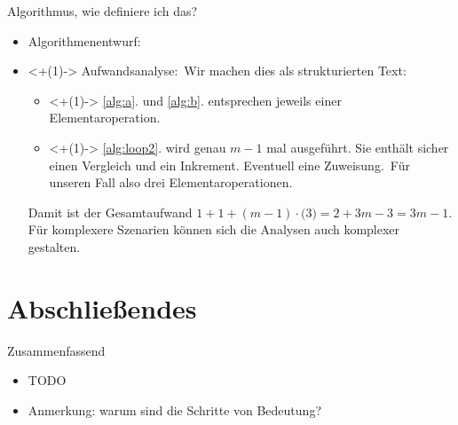\begin{frame}{Algorithmus, wie definiere ich das?}
\begin{itemize}[]
    \item Algorithmenentwurf: \\
    \usebox\algobox
    \item<+(1)-> Aufwandsanalyse:\pause\ Wir machen dies als strukturierten Text: \begin{itemize}
        \item<+(1)-> \ref{alg:a}. und \ref{alg:b}. entsprechen jeweils einer Elementaroperation.
        \item<+(1)-> \ref{alg:loop2}. wird genau \(m - 1\) mal ausgeführt. Sie enthält sicher einen Vergleich und ein Inkrement. Eventuell eine Zuweisung.\pause\ Für unseren Fall also drei Elementaroperationen.
    \end{itemize}
        \pause Damit ist der Gesamtaufwand \(1 + 1 + (m - 1) \cdot \bigl( 3 \bigr) = 2 + 3m - 3 = 3m - 1\).\medskip\\
        \pause Für komplexere Szenarien können sich die Analysen auch komplexer gestalten.
\end{itemize}
\end{frame}
\fi

\section{Abschließendes}
{\SummaryFrame
\begin{frame}[t]{Zusammenfassend}
\pause \printBibCommand
\vfill\vfill %
\begin{itemize}[<+(1)->]
    \itemsep16pt
    \item TODO
    \item Anmerkung: warum sind die Schritte von Bedeutung?
\end{itemize}
\end{frame}
}


\iffull\fi
